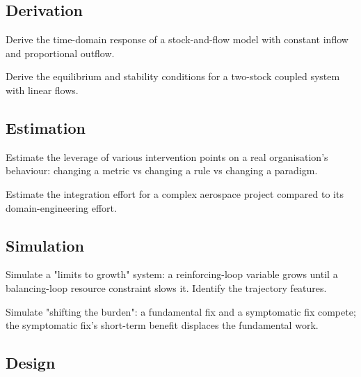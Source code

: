 \subsection*{Derivation}

\begin{exercise}
Derive the time-domain response of a stock-and-flow model with constant inflow and proportional outflow.
\end{exercise}

\begin{exercise}
Derive the equilibrium and stability conditions for a two-stock coupled system with linear flows.
\end{exercise}

\subsection*{Estimation}

\begin{exercise}
Estimate the leverage of various intervention points on a real organisation's behaviour: changing a metric vs changing a rule vs changing a paradigm.
\end{exercise}

\begin{exercise}
Estimate the integration effort for a complex aerospace project compared to its domain-engineering effort.
\end{exercise}

\subsection*{Simulation}

\begin{exercise}
Simulate a "limits to growth" system: a reinforcing-loop variable grows until a balancing-loop resource constraint slows it. Identify the trajectory features.
\end{exercise}

\begin{exercise}
Simulate "shifting the burden": a fundamental fix and a symptomatic fix compete; the symptomatic fix's short-term benefit displaces the fundamental work.
\end{exercise}

\subsection*{Design}

